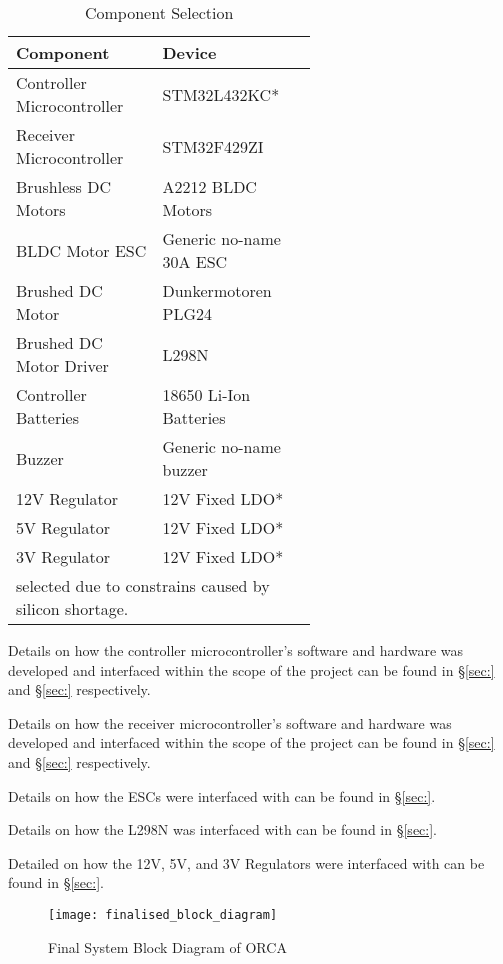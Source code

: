 \documentclass [11pt]{article}
\begin{document}
\begin{table}[H]
\centering
\setlength{\arrayrulewidth}{1.5pt}
\begin{tabular}{|p{0.3\linewidth}|p{0.3\linewidth}|}
\hline
\cellcolor{gray!40}Component & \cellcolor{gray!40}Device \\ 
\hline
Controller Microcontroller  & STM32L432KC* \\
\hline
Receiver Microcontroller   & STM32F429ZI\\
\hline
Brushless DC Motors   & A2212 BLDC Motors \\
\hline
BLDC Motor ESC   & Generic no-name 30A ESC\\
\hline
Brushed DC Motor   & Dunkermotoren PLG24 \\
\hline
Brushed DC Motor Driver  & L298N\\
\hline
Controller Batteries   & 18650 Li-Ion Batteries \\
\hline
Buzzer   & Generic no-name buzzer \\
\hline
12V Regulator & 12V Fixed LDO* \\
\hline
5V Regulator & 12V Fixed LDO*\\
\hline
3V Regulator & 12V Fixed LDO*\\
\hline
\multicolumn{2}{l}{\small *selected due to constrains caused by silicon shortage.} \\
\end{tabular}
\caption{Component Selection}
\label{table:component_selection}
\end{table}


{\parindent0pt


Details on how the controller microcontroller's software and hardware was developed and interfaced within the scope of the project can be found in  §\ref{sec:} and §\ref{sec:} respectively.

Details on how the receiver microcontroller's software and hardware was developed and interfaced within the scope of the project can be found in  §\ref{sec:} and §\ref{sec:} respectively.

Details on how the ESCs were interfaced with can be found in §\ref{sec:}.

Details on how the L298N was interfaced with can be found in §\ref{sec:}.

Detailed on how the 12V, 5V, and 3V Regulators were interfaced with can be found in §\ref{sec:}.

}

\begin{figure}[H]
\centerline{\texttt{[image: finalised\_block\_diagram]}}
\caption{Final System Block Diagram of ORCA}
\label{fig:finalised_block_diagram}
\end{figure}
\end{document}
